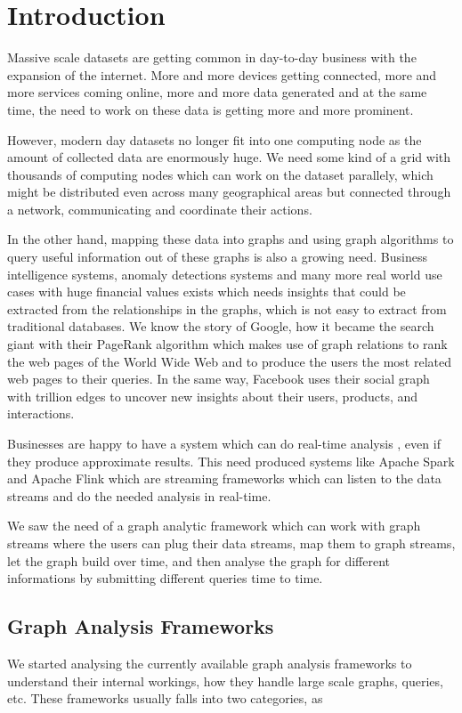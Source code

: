 \documentclass[conference]{IEEEtran}
\begin{document}
\section{Introduction}
Massive scale datasets are getting common in day-to-day business with the expansion of the internet. More and more devices getting connected, more and more services coming online, more and more data generated and at the same time, the need to work on these data is getting more and more prominent.


However, modern day datasets no longer fit into one computing node as the amount of collected data are enormously huge.  We need some kind of a grid with thousands of computing nodes which can work on the dataset parallely, which might be distributed even across many geographical areas but connected through a network, communicating and coordinate their actions.


In the other hand, mapping these data into graphs and using graph algorithms to query useful information out of these graphs is also a growing need. Business intelligence systems, anomaly detections systems and many more real world use cases with huge financial values exists which needs insights that could be extracted from the relationships in the graphs, which is not easy to extract from traditional databases. We know the story of Google, how it became the search giant with their PageRank\cite{PageRank} algorithm which makes use of graph relations to rank the web pages of the World Wide Web and to produce the users the most related web pages to their queries. In the same way, Facebook uses their social graph with trillion edges\cite{Facebook} to uncover new insights about their users, products, and interactions.


Businesses are happy to have a system which can do real-time analysis \cite{Vitria}, even if they produce approximate results. This need produced systems like Apache Spark and Apache Flink which are streaming frameworks which can listen to the data streams and do the needed  analysis in real-time. 


We saw the need of a graph analytic framework which can work with graph streams where the users can plug their data streams, map them to graph streams, let the graph build over time, and then analyse the graph for different informations by submitting different queries time to time.

\subsection{Graph Analysis Frameworks}
We started analysing the currently available graph analysis frameworks to understand their internal workings, how they handle large scale graphs, queries, etc. These frameworks usually falls into two categories, as
\end{document}

